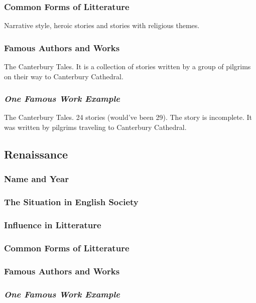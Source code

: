 \subsubsection{Common Forms of Litterature}
Narrative style, heroic stories and stories with religious themes.

\subsubsection{Famous Authors and Works}
The Canterbury Tales. It is a collection of stories written by a group of pilgrims on their way to Canterbury Cathedral.

\subsubsection{\textit{One Famous Work Example}}
The Canterbury Tales. 24 stories (would've been 29). The story is incomplete. It was written by pilgrims traveling to Canterbury Cathedral.

\newpage
\subsection{Renaissance}

\subsubsection{Name and Year}

\subsubsection{The Situation in English Society}

\subsubsection{Influence in Litterature}

\subsubsection{Common Forms of Litterature}

\subsubsection{Famous Authors and Works}

\subsubsection{\textit{One Famous Work Example}}

